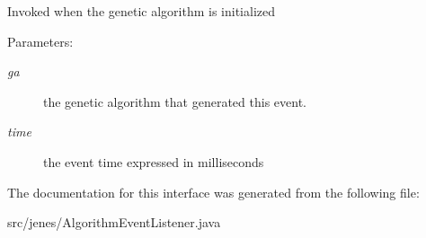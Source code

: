 Invoked when the genetic algorithm is initialized

\begin{Desc}
\item[Parameters:]
\begin{description}
\item[{\em ga}]the genetic algorithm that generated this event. \item[{\em time}]the event time expressed in milliseconds \end{description}
\end{Desc}


The documentation for this interface was generated from the following file:\begin{CompactItemize}
\item 
src/jenes/AlgorithmEventListener.java\end{CompactItemize}
